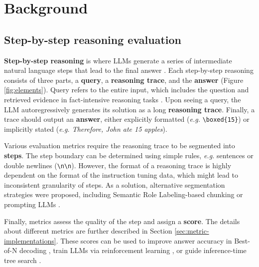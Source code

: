 \section{Background}
\label{sec:step-by-step}

\subsection{Step-by-step reasoning evaluation}

\label{sec:elements}

\textbf{Step-by-step reasoning} is where LLMs generate a series of intermediate natural language steps that lead to the final answer \citep{NEURIPS2022_9d560961}. Each step-by-step reasoning consists of three parts, a \textbf{query}, a \textbf{reasoning trace}, and the \textbf{answer} (Figure \ref{fig:elements}). Query refers to the entire input, which includes the question and retrieved evidence in fact-intensive reasoning tasks \citep{NEURIPS2020_6b493230}. Upon seeing a query, the LLM autoregressively generates its solution as a long \textbf{reasoning trace}. Finally, a trace should output an \textbf{answer}, either explicitly formatted (\textit{e.g.} \texttt{\textbackslash boxed\{15\}}) or implicitly stated (\textit{e.g. Therefore, John ate 15 apples}).

Various evaluation metrics require the reasoning trace to be segmented into \textbf{steps}. The step boundary can be determined using simple rules, \textit{e.g.} sentences or double newlines (\texttt{\textbackslash n\textbackslash n}). However, the format of a reasoning trace is highly dependent on the format of the instruction tuning data, which might lead to inconsistent granularity of steps. As a solution, alternative segmentation strategies were proposed, including Semantic Role Labeling-based chunking \citet{prasad-etal-2023-receval} or prompting LLMs \citet{zheng2024processbenchidentifyingprocesserrors}.

Finally, metrics assess the quality of the step and assign a \textbf{score}. The details about different metrics are further described in Section \ref{sec:metric-implementations}. These scores can be used to improve answer accuracy in Best-of-N decoding \citep{cui2024ultrafeedbackboostinglanguagemodels, zhang2025lessonsdevelopingprocessreward}, train LLMs via reinforcement learning \citep{wang-etal-2024-math, zhang2025lessonsdevelopingprocessreward}, or guide inference-time tree search \citep{NEURIPS2023_271db992, yang2022generatingnaturallanguageproofs}.

